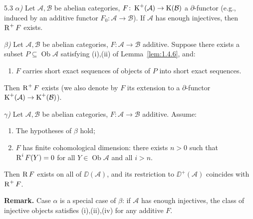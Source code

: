 \begin{bookcorollary}{5.3}\label{cor:1.5.3}
\emph{$\alpha$)} Let $\mathcal{A},\mathcal{B}$ be abelian categories, $F\colon\operatorname{K}^+(\mathcal{A})\to\operatorname{K}(\mathcal{B})$ a $\partial$-functor (e.g., induced by an additive functor $F_0\colon\mathcal{A}\to\mathcal{B}$). If $\mathcal{A}$ has enough injectives, then $\operatorname{R}^+F$ exists.

\emph{$\beta$)} Let $\mathcal{A},\mathcal{B}$ be abelian categories, $F\colon\mathcal{A}\to\mathcal{B}$ additive. Suppose there exists a subset $P\subseteq\operatorname{Ob}\mathcal{A}$ satisfying (i),(ii) of Lemma~\ref{lem:1.4.6}, and:
\begin{enumerate}
\item[(iv)] $F$ carries short exact sequences of objects of $P$ into short exact sequences.
\end{enumerate}
Then $\operatorname{R}^+F$ exists (we also denote by $F$ its extension to a $\partial$-functor $\operatorname{K}^+(\mathcal{A})\to\operatorname{K}^+(\mathcal{B})$).

\emph{$\gamma$)} Let $\mathcal{A},\mathcal{B}$ be abelian categories, $F\colon\mathcal{A}\to\mathcal{B}$ additive. Assume:
\begin{enumerate}
\item[(a)] The hypotheses of $\beta$ hold;
\item[(b)] $F$ has finite cohomological dimension: there exists $n>0$ such that $\operatorname{R}^iF(Y)=0$ for all $Y\in\operatorname{Ob}\mathcal{A}$ and all $i>n$.
\end{enumerate}
Then $\operatorname{R} F$ exists on all of $\DD(\mathcal{A})$, and its restriction to $\DD^+(\mathcal{A})$ coincides with $\operatorname{R}^+F$.
\end{bookcorollary}

\textbf{Remark.} Case $\alpha$ is a special case of $\beta$: if $\mathcal{A}$ has enough injectives, the class of injective objects satisfies (i),(ii),(iv) for any additive $F$.

